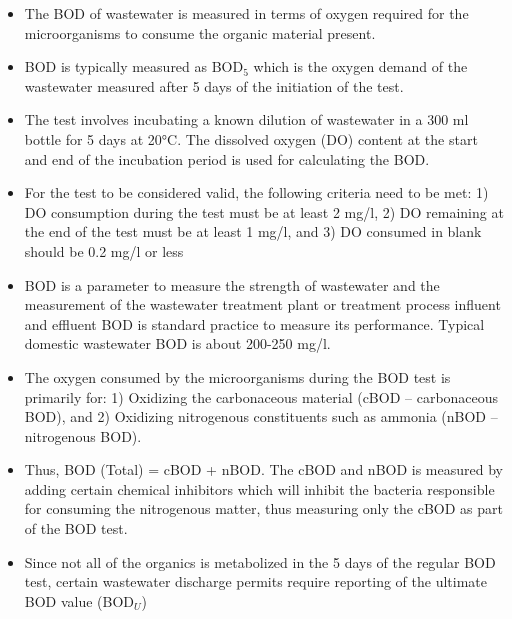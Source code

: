 \begin{itemize}
			      	\begin{itemize}
			      		\item The BOD of wastewater is measured in terms of oxygen required for the microorganisms to consume the organic material present.
			      		\item BOD is typically measured as BOD$_5$ which is the oxygen demand of the wastewater measured after 5 days of the initiation of the test.
			      		\item The test involves incubating a known dilution of wastewater in a 300 ml bottle for 5 days at 20\si{\degree}C.  The dissolved oxygen (DO) content at the start and end of the incubation period is used for calculating the BOD.
			      		\item For the test to be considered valid, the following criteria need to be met: 1) DO consumption during the test must be at least 2 mg/l, 2) DO remaining at the end of the test must be at least 1 mg/l, and 3) DO consumed in blank should be 0.2 mg/l or less
			      		      			
			      		\item BOD is a parameter to measure the strength of wastewater and the measurement of the wastewater treatment plant or treatment process influent and effluent BOD is standard practice to measure its performance.  Typical domestic wastewater BOD is about 200-250 mg/l.
			      		\item The oxygen consumed by the microorganisms during the BOD test is primarily for: 1) Oxidizing the carbonaceous material (cBOD – carbonaceous BOD), and 2) Oxidizing nitrogenous constituents such as ammonia (nBOD – nitrogenous BOD).
			      		\item Thus, BOD (Total) = cBOD + nBOD.  The cBOD and nBOD is measured by adding certain chemical inhibitors which will inhibit the bacteria responsible for consuming the nitrogenous matter, thus measuring only the cBOD as part of the BOD test.
			      		\item Since not all of the organics is metabolized in the 5 days of the regular BOD test, certain wastewater discharge permits require reporting of the ultimate BOD value (BOD$_U$)\\
			      	\end{itemize}


\end{itemize}
